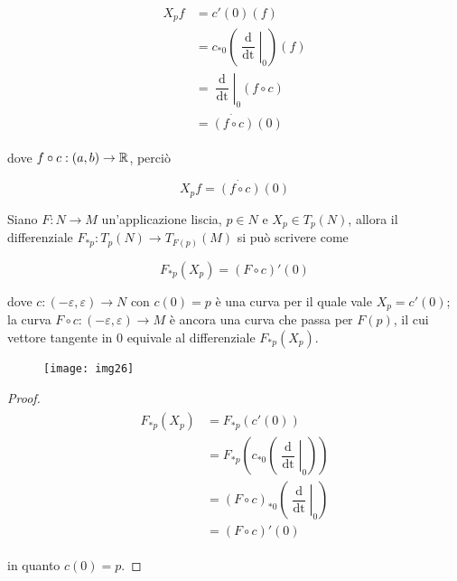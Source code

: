 \begin{align}
	\begin{split}
		X_{p} f &= c'(0) (f)\\
		&= c_{*0} \left( \left. \dfrac{\operatorname{d}}{\operatorname{dt}} \right|_{0} \right) (f)\\
		&= \left. \dfrac{\operatorname{d}}{\operatorname{dt}} \right|_{0} (f \circ c)\\
		&= \dot{(f \circ c)}(0)
	\end{split}
\end{align}

dove $ f \circ c : (a,b) \to \mathbb{R} $, perciò

\begin{equation}
	X_{p} f = \dot{(f \circ c)}(0)
\end{equation}

\begin{definition}
	Siano $ F : N \to M $ un'applicazione liscia, $ p \in N $ e $ X_{p} \in T_{p}(N) $, allora il differenziale $ F_{*p} : T_{p}(N) \to T_{F(p)}(M) $ si può scrivere come
	
	\begin{equation}
		F_{*p}(X_{p}) = (F \circ c)' (0)
	\end{equation}

	dove $ c : (-\varepsilon,\varepsilon) \to N $ con $ c(0) = p $ è una curva per il quale vale $ X_{p} = c'(0) $; la curva $ F \circ c : (-\varepsilon,\varepsilon) \to M $ è ancora una curva che passa per $ F(p) $, il cui vettore tangente in 0 equivale al differenziale $ F_{*p}(X_{p}) $.
	
	\begin{figure}[H]
		\centering
		\texttt{[image: img26]}
	\end{figure}
\end{definition}

\begin{proof}
	\begin{align}
		\begin{split}
			F_{*p}(X_{p}) &= F_{*p}(c'(0))\\
			&= F_{*p} \left( c_{*0} \left( \left. \dfrac{\operatorname{d}}{\operatorname{dt}} \right|_{0} \right) \right)\\
			&= (F \circ c)_{*0} \left( \left. \dfrac{\operatorname{d}}{\operatorname{dt}} \right|_{0} \right)\\
			&= (F \circ c)' (0)
		\end{split}
	\end{align}

	in quanto $ c(0)=p $.
\end{proof}

